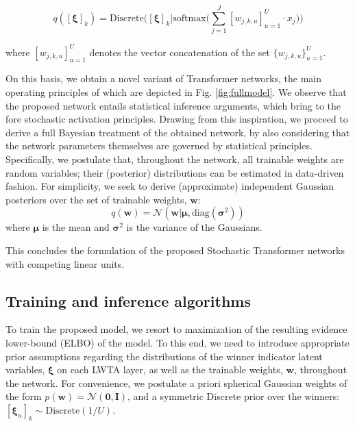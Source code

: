 \documentclass[10pt,twocolumn,letterpaper]{article}
\begin{document}
\begin{equation}
\label{eqn:dense_xi}
q([\boldsymbol{\xi}]_k) =  \mathrm{Discrete}\bigg([\boldsymbol{\xi}]_k \bigg| \mathrm{softmax}\big( \sum_{j=1}^J [w_{j,k,u}]_{u=1}^{U} \cdot x_j \big) \bigg)
\end{equation}

where $[w_{j,k,u}]_{u=1}^{U}$ denotes the vector concatenation of the set $\{w_{j,k,u}\}_{u=1}^{U}$.

On this basis, we obtain a novel variant of Transformer networks, the main operating principles of which  are depicted in Fig. \ref{fig:fullmodel}. We observe that the proposed network entails statistical inference arguments, which bring to the fore stochastic activation principles. Drawing from this inspiration, we proceed to derive a full Bayesian treatment of the obtained network, by also considering that the network parameters themselves are governed by statistical principles. Specifically, we postulate that, throughout the network, all trainable weights are random variables; their (posterior) distributions can be estimated in data-driven fashion. For simplicity, we seek to derive (approximate) independent Gaussian posteriors over the set of trainable weights, $\boldsymbol{w}$:
\begin{equation}
q(\boldsymbol{w}) = \mathcal{N}(\boldsymbol{w}| \boldsymbol{\mu}, \mathrm{diag}(\boldsymbol{\sigma}^2))
\end{equation}
where $\boldsymbol{\mu}$ is the mean and $\boldsymbol{\sigma}^2$ is the variance of the Gaussians.

This concludes the formulation of the proposed Stochastic Transformer networks with competing linear units.


\subsection{Training and inference algorithms}

To train the proposed model, we resort to maximization of the resulting evidence lower-bound (ELBO) of the model. To this end, we need to introduce appropriate prior assumptions regarding the distributions of the winner indicator latent variables, $\boldsymbol{\xi}$ on each LWTA layer, as well as the trainable weights, $\boldsymbol{w}$, throughout the network. For convenience, we postulate a priori spherical Gaussian weights of the form $p(\boldsymbol{w}) = \mathcal{N}(\boldsymbol{0}, \boldsymbol{I})$, and a symmetric Discrete prior over the winners: $[\boldsymbol{\xi}_n]_k \sim \mathrm{Discrete}(1/U)$.
\end{document}

